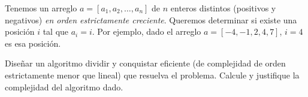 
Tenemos un arreglo $a = [a_1, a_2, \dots, a_n]$ de $n$ enteros
distintos (positivos y negativos) \emph{en orden estrictamente creciente}. Queremos
determinar si existe una posición $i$ tal que $a_i=i$. Por
ejemplo, dado el arreglo $a = [-4,-1, 2, 4, 7]$, $i = 4$ es esa
posición. 

Diseñar un algoritmo dividir y conquistar
eficiente (de complejidad de orden estrictamente menor que lineal) que resuelva el
problema. Calcule y justifique la complejidad del algoritmo dado.
